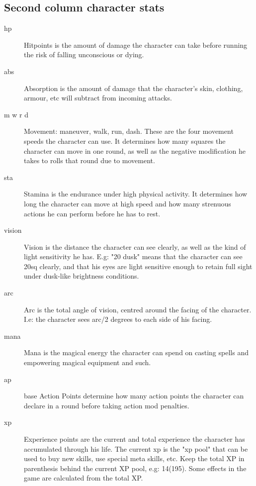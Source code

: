\subsection*{Second column character stats}

\begin{description}

\item[hp] Hitpoints is the amount of damage the character can take before running the risk of falling unconscious or dying.

\item[abs] Absorption is the amount of damage that the character's skin, clothing, armour, etc will subtract from incoming attacks.

\item[m w r d] Movement: maneuver, walk, run, dash. These are the four movement speeds the character can use. It determines how many squares the character can move in one round, as well as the negative modification he takes to rolls that round due to movement.

\item[sta] Stamina is the endurance under high physical activity. It determines how long the character can move at high speed and how many strenuous actions he can perform before he has to rest.

\item[vision] Vision is the distance the character can see clearly, as well as the kind of light sensitivity he has. E.g: "20 dusk" means that the character can see 20sq clearly, and that his eyes are light sensitive enough to retain full sight under dusk-like brightness conditions.

\item[arc] Arc is the total angle of vision, centred around the facing of the character. I.e: the character sees arc/2 degrees to each side of his facing.

\item[mana] Mana is the magical energy the character can spend on casting spells and empowering magical equipment and such.

\item[ap] base Action Points determine how many action points the character can declare in a round before taking action mod penalties.

\item[xp] Experience points are the current and total experience the character has accumulated through his life. The current xp is the "xp pool" that can be used to buy new skills, use special meta skills, etc. Keep the total XP in parenthesis behind the current XP pool, e.g: 14(195). Some effects in the game are calculated from the total XP.

\end{description}

